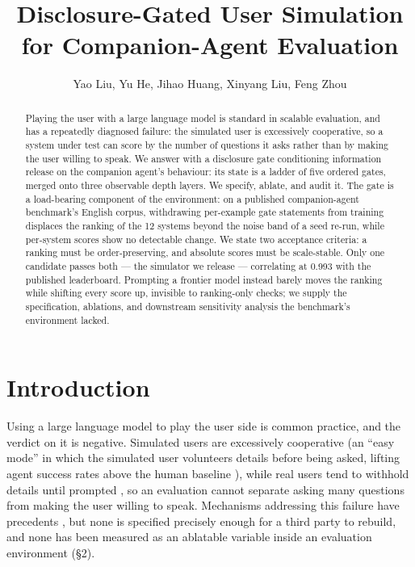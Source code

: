 \documentclass[letterpaper]{article}
\title{Disclosure-Gated User Simulation for Companion-Agent Evaluation}
\author{Yao Liu, Yu He, Jihao Huang, Xinyang Liu, Feng Zhou}
\begin{document}
\maketitle
\begin{abstract}
Playing the user with a large language model is standard in scalable evaluation, and has a repeatedly diagnosed failure: the simulated user is excessively cooperative, so a system under test can score by the number of questions it asks rather than by making the user willing to speak. We answer with a disclosure gate conditioning information release on the companion agent's behaviour: its state is a ladder of five ordered gates, merged onto three observable depth layers. We specify, ablate, and audit it. The gate is a load-bearing component of the environment: on a published companion-agent benchmark's English corpus, withdrawing per-example gate statements from training displaces the ranking of the 12 systems beyond the noise band of a seed re-run, while per-system scores show no detectable change. We state two acceptance criteria: a ranking must be order-preserving, and absolute scores must be scale-stable. Only one candidate passes both --- the simulator we release --- correlating at 0.993 with the published leaderboard. Prompting a frontier model instead barely moves the ranking while shifting every score up, invisible to ranking-only checks; we supply the specification, ablations, and downstream sensitivity analysis the benchmark's environment lacked.
\end{abstract}
\setlength{\emergencystretch}{3em}
\newcommand{\apxsection}[2]{\par\addvspace{12pt}%
  {\centering\normalfont\Large\bfseries Appendix #1\quad #2\par}%
  \nopagebreak\vspace{4pt}\nopagebreak\noindent\ignorespaces}
\renewcommand{\topfraction}{0.95}
\renewcommand{\bottomfraction}{0.95}
\renewcommand{\textfraction}{0.05}
\renewcommand{\floatpagefraction}{0.85}



\section{Introduction}


Using a large language model to play the user side is common practice, and the verdict on it is negative. Simulated users are excessively cooperative (an ``easy mode'' in which the simulated user volunteers details before being asked, lifting agent success rates above the human baseline \citep{sim2real}), while real users tend to withhold details until prompted \citep{ppol}, so an evaluation cannot separate asking many questions from making the user willing to speak. Mechanisms addressing this failure have precedents \citep{miconsistent, aisp, medconceal, patientact}, but none is specified precisely enough for a third party to rebuild, and none has been measured as an ablatable variable inside an evaluation environment (\S{}2).
\end{document}
